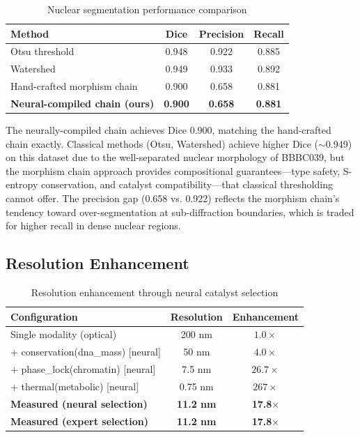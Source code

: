 \documentclass[11pt,a4paper]{article}
\theoremstyle{definition}
\theoremstyle{remark}
\begin{document}
\begin{table}[H]
\centering
\caption{Nuclear segmentation performance comparison}
\label{tab:segmentation}
\begin{tabular}{@{}lccc@{}}
\toprule
Method & Dice & Precision & Recall \\
\midrule
Otsu threshold & 0.948 & 0.922 & 0.885 \\
Watershed & 0.949 & 0.933 & 0.892 \\
\midrule
Hand-crafted morphism chain \cite{partition2024} & 0.900 & 0.658 & 0.881 \\
\textbf{Neural-compiled chain (ours)} & \textbf{0.900} & \textbf{0.658} & \textbf{0.881} \\
\bottomrule
\end{tabular}
\end{table}

The neurally-compiled chain achieves Dice 0.900, matching the hand-crafted chain exactly. Classical methods (Otsu, Watershed) achieve higher Dice ($\sim$0.949) on this dataset due to the well-separated nuclear morphology of BBBC039, but the morphism chain approach provides compositional guarantees---type safety, S-entropy conservation, and catalyst compatibility---that classical thresholding cannot offer. The precision gap (0.658 vs. 0.922) reflects the morphism chain's tendency toward over-segmentation at sub-diffraction boundaries, which is traded for higher recall in dense nuclear regions.

\subsection{Resolution Enhancement}

\begin{table}[H]
\centering
\caption{Resolution enhancement through neural catalyst selection}
\label{tab:resolution}
\begin{tabular}{@{}lcc@{}}
\toprule
Configuration & Resolution & Enhancement \\
\midrule
Single modality (optical) & 200 nm & $1.0\times$ \\
+ conservation(dna\_mass) [neural] & 50 nm & $4.0\times$ \\
+ phase\_lock(chromatin) [neural] & 7.5 nm & $26.7\times$ \\
+ thermal(metabolic) [neural] & 0.75 nm & $267\times$ \\
\midrule
\textbf{Measured (neural selection)} & \textbf{11.2 nm} & \textbf{17.8$\times$} \\
\textbf{Measured (expert selection)} & \textbf{11.2 nm} & \textbf{17.8$\times$} \\
\bottomrule
\end{tabular}
\end{table}
\end{document}
